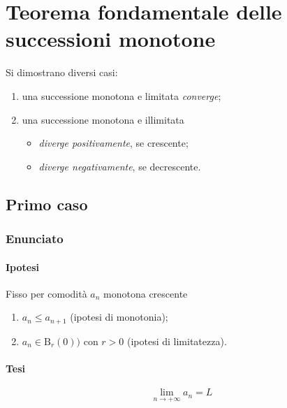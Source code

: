 \documentclass[../../dimostrazioni]{subfiles}
\begin{document}
    \chapter{Teorema fondamentale delle successioni monotone}
    \label{teoFondSuccMono}

        Si dimostrano diversi casi:
        \begin{enumerate}
            \indentitem \item una successione monotona e limitata \emph{converge};
            \indentitem \item una successione monotona e illimitata
                \begin{itemize}
                    \indentitem \item \emph{diverge positivamente}, se crescente;
                    \indentitem \item \emph{diverge negativamente}, se decrescente.
                \end{itemize}
        \end{enumerate}            


        \section*{Primo caso}
            
            \subsection*{Enunciato}
                
                \subsubsection*{Ipotesi}
                         
                Fisso per comodità \(a_n\) monotona crescente

                \begin{enumerate}
                    \indentitem \item \(a_n \leqslant a_{n+1}\) (ipotesi di monotonia);
                    \indentitem \item \(a_n \in \mathrm{B}_r(0))\) con \(r > 0 \) (ipotesi di limitatezza).
                \end{enumerate}
                
                \subsubsection*{Tesi}
                    \[\lim_{n \to +\infty} a_n = L\]
            
\end{document}
